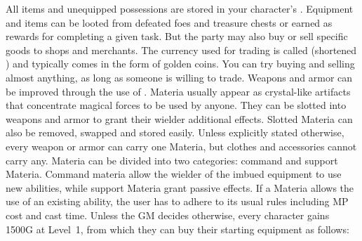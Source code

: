 %
\vfill
%
All items and unequipped possessions are stored in your character's .
Equipment and items can be looted from defeated foes and treasure chests or earned as rewards for completing a given task. 
But the party may also buy or sell specific goods to shops and merchants. 
The currency used for trading is called  (shortened ) and typically comes in the form of golden coins.
You can try buying and selling almost anything, as long as someone is willing to trade.
%
\newpage
%
%
\vfill
%
%
\vfill
%
Weapons and armor can be improved through the use of .
Materia usually appear as crystal-like artifacts that concentrate magical forces to be used by anyone.
They can be slotted into weapons and armor to grant their wielder additional effects.
Slotted Materia can also be removed, swapped and stored easily. 
Unless explicitly stated otherwise, every weapon or armor can carry one Materia, but clothes and accessories cannot carry any.
Materia can be divided into two categories: command and support Materia.
Command materia allow the wielder of the imbued equipment to use new abilities, while support Materia grant passive effects.
If a Materia allows the use of an existing ability, the user has to adhere to its usual rules including MP cost and cast time.
%
\vfill
%
%
\vfill
%
Unless the GM decides otherwise, every character gains 1500G at Level~1, from which they can buy their starting equipment as follows:
\ofrow
{}
\vspace*{-0.25cm}\\
